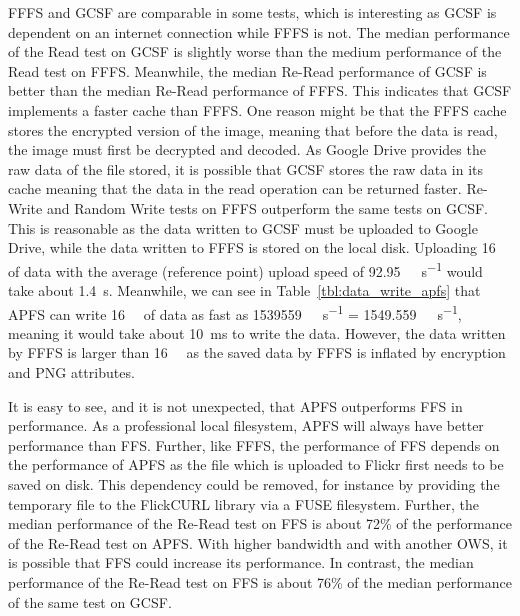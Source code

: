 \gls{FFFS} and \gls{GCSF} are comparable in some tests, which is interesting as \gls{GCSF} is dependent on an internet connection while \gls{FFFS} is not. The median performance of the Read test on \gls{GCSF} is slightly worse than the medium performance of the Read test on \gls{FFFS}. Meanwhile, the median Re-Read performance of \gls{GCSF} is better than the median Re-Read performance of \gls{FFFS}. This indicates that \gls{GCSF} implements a faster cache than \gls{FFFS}. One reason might be that the \gls{FFFS} cache stores the encrypted version of the image, meaning that before the data is read, the image must first be decrypted and decoded. As Google Drive provides the raw data of the file stored, it is possible that \gls{GCSF} stores the raw data in its cache meaning that the data in the read operation can be returned faster. Re-Write and Random Write tests on \gls{FFFS} outperform the same tests on \gls{GCSF}. This is reasonable as the data written to \gls{GCSF} must be uploaded to Google Drive, while the data written to \gls{FFFS} is stored on the local disk. Uploading \SI{16}{\mega\byte} of data with the average (reference point) upload speed of \SI[per-mode = symbol]{92.95}{\mega\bit\per\second} would take about \SI{1.4}{\second}. Meanwhile, we can see in Table~\ref{tbl:data_write_apfs} that \gls{APFS} can write \SI{16}{\mega\byte} of data as fast as \SI[per-mode = symbol]{1539559}{\kilo\byte\per\second} = \SI[per-mode = symbol]{1549.559}{\mega\byte\per\second}, meaning it would take about \SI{10}{\milli\second} to write the data. However, the data written by \gls{FFFS} is larger than \SI{16}{\mega\byte} as the saved data by \gls{FFFS} is inflated by encryption and PNG attributes.

It is easy to see, and it is not unexpected, that \gls{APFS} outperforms \gls{FFS} in performance. As a professional local filesystem, \gls{APFS} will always have better performance than FFS. Further, like \gls{FFFS}, the performance of \gls{FFS} depends on the performance of \gls{APFS} as the file which is uploaded to Flickr first needs to be saved on disk. This dependency could be removed, for instance by providing the temporary file to the FlickCURL library via a \gls{FUSE} filesystem. Further, the median performance of the Re-Read test on \gls{FFS} is about 72\% of the performance of the Re-Read test on \gls{APFS}. With higher bandwidth and with another \gls{OWS}, it is possible that \gls{FFS} could increase its performance. In contrast, the median performance of the Re-Read test on \gls{FFS} is about 76\% of the median performance of the same test on \gls{GCSF}.